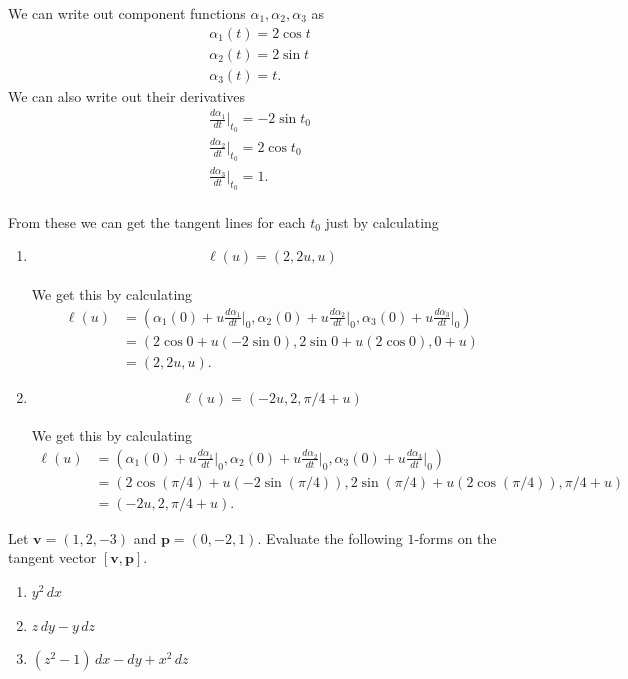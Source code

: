 \documentclass[12 pt, letterpaper]{hmcpset}
\begin{document}
\begin{solution}
	We can write out component functions $\alpha_1, \alpha_2, \alpha_3$ as
	\[
		\begin{gathered}
			\alpha_1(t) = 2 \cos t \\
			\alpha_2(t) = 2 \sin t \\
			\alpha_3(t) = t.
		\end{gathered}
	\]
	We can also write out their derivatives
	\[
		\begin{gathered}
			\frac{d \alpha_1}{dt} \Big |_{t_0} = - 2 \sin t_0 \\
			\frac{d \alpha_2}{dt} \Big |_{t_0} = 2 \cos t_0 \\
			\frac{d \alpha_3}{dt} \Big |_{t_0} = 1.
		\end{gathered}
	\] \\
	From these we can get the tangent lines for each $t_0$ just by calculating
	\begin{enumerate}
		\item
			\[
				\boxed{
					\ell(u) = (2, 2 u, u)
				}
			\] \\
			We get this by calculating
			\[
				\begin{split}
					\ell(u) & = \left ( \alpha_1(0) + u \frac{d \alpha_1}{dt} \Big |_0, \alpha_2(0) + u \frac{d \alpha_2}{dt} \Big |_0, \alpha_3(0) + u \frac{d \alpha_3}{dt} \Big |_0 \right ) \\
						& = ( 2 \cos 0 + u (-2 \sin 0), 2 \sin 0 + u (2 \cos 0), 0 + u) \\
						& = (2, 2u, u).
				\end{split}
			\]
		\item
			\[
				\boxed{
					\ell(u) = (- 2 u, 2, \pi/4 + u)
				}
			\] \\
			We get this by calculating
			\[
				\begin{split}
					\ell(u) & = \left ( \alpha_1(0) + u \frac{d \alpha_1}{dt} \Big |_0, \alpha_2(0) + u \frac{d \alpha_2}{dt} \Big |_0, \alpha_3(0) + u \frac{d \alpha_3}{dt} \Big |_0 \right ) \\
						& = ( 2 \cos (\pi/4) + u (-2 \sin (\pi/4)), 2 \sin (\pi/4) + u (2 \cos (\pi/4)), \pi/4 + u) \\
						& = (-2u, 2, \pi/4 + u).
				\end{split}
			\]
	\end{enumerate}
\end{solution}

\pagebreak

\begin{problem}[Problem 2]
	Let $\mathbf v = (1, 2, -3)$ and $\mathbf p = (0, -2, 1)$. Evaluate the following $1$-forms on the tangent vector $[\mathbf v, \mathbf p]$.
	\begin{enumerate}
		\item $y^2 \, dx$
		\item $z \, dy - y \, dz$
		\item $(z^2 - 1) \, dx - dy + x^2 \, dz$
	\end{enumerate}
\end{problem}
\end{document}
